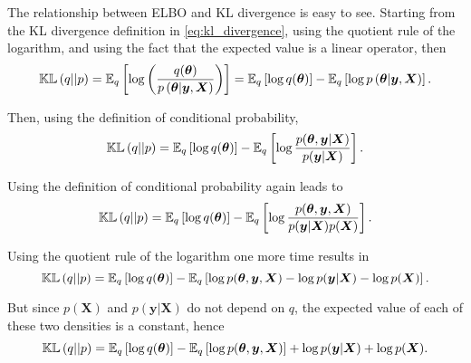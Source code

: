 The relationship between ELBO and KL divergence is easy to see. Starting from the KL divergence definition in \eqref{eq:kl_divergence}, using the quotient rule of the logarithm, and using the fact that the expected value is a linear operator, then
\begin{equation}
    \mathbb{KL}\left( q || p \right) =
    \mathbb{E}_q \left[ \log \left( \frac{q(\boldsymbol{\theta})}{p\left( \boldsymbol{\theta} | \boldsymbol{y}, \boldsymbol{X} \right)} \right) \right] =
    \mathbb{E}_q \left[ \log  q(\boldsymbol{\theta}) \right] - \mathbb{E}_q \left[ \log {p\left( \boldsymbol{\theta} | \boldsymbol{y}, \boldsymbol{X} \right)}  \right].
\end{equation}

Then, using the definition of conditional probability,
\begin{equation}
    \mathbb{KL}\left( q || p \right) =
    \mathbb{E}_q \left[ \log  q(\boldsymbol{\theta}) \right] - \mathbb{E}_q \left[ \log \frac{p(\boldsymbol{\theta}, \boldsymbol{y} | \boldsymbol{X})}{p(\boldsymbol{y} | \boldsymbol{X})}  \right].
\end{equation}

Using the definition of conditional probability again leads to
\begin{equation}
    \mathbb{KL}\left( q || p \right) =
    \mathbb{E}_q \left[ \log  q(\boldsymbol{\theta}) \right] - \mathbb{E}_q \left[ \log \frac{p(\boldsymbol{\theta}, \boldsymbol{y}, \boldsymbol{X})}{p(\boldsymbol{y} | \boldsymbol{X}) p(\boldsymbol{X})}  \right].
\end{equation}

Using the quotient rule of the logarithm one more time results in
\begin{equation}
  \mathbb{KL}\left( q || p \right) =
  \mathbb{E}_q \left[ \log  q(\boldsymbol{\theta}) \right] - \mathbb{E}_q \left[ \log p(\boldsymbol{\theta}, \boldsymbol{y}, \boldsymbol{X}) - \log p(\boldsymbol{y} | \boldsymbol{X}) - \log p(\boldsymbol{X})  \right].
\end{equation}

But since $p(\boldsymbol{X})$ and $p(\boldsymbol{y} | \boldsymbol{X})$ do not depend on $q$, the expected value of each of these two densities is a constant, hence
\begin{equation}
 \mathbb{KL}\left( q || p \right) =
 \mathbb{E}_q \left[ \log  q(\boldsymbol{\theta}) \right] - \mathbb{E}_q \left[ \log p(\boldsymbol{\theta}, \boldsymbol{y}, \boldsymbol{X}) \right] + \log p(\boldsymbol{y} | \boldsymbol{X}) + \log p(\boldsymbol{X}).
\end{equation}

